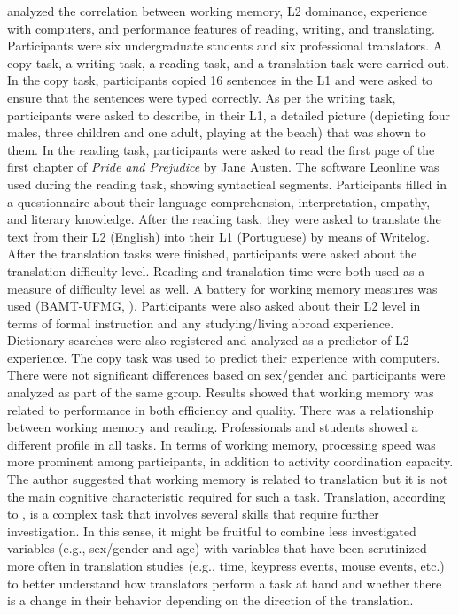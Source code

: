 \documentclass[output=paper]{langscibook}
\begin{document}
\citet{rothe2002caracteristicas} analyzed the correlation between working memory, L2 dominance, experience with computers, and performance features of reading, writing, and translating. Participants were six undergraduate students and six professional translators. A copy task, a writing task, a reading task, and a translation task were carried out. In the copy task, participants copied 16 sentences in the L1 and were asked to ensure that the sentences were typed correctly. As per the writing task, participants were asked to describe, in their L1, a detailed picture (depicting four males, three children and one adult, playing at the beach) that was shown to them. In the reading task, participants were asked to read the first page of the first chapter of \textit{Pride and Prejudice} by Jane Austen. The software Leonline was used during the reading task, showing syntactical segments. Participants filled in a questionnaire about their language comprehension, interpretation, empathy, and literary knowledge. After the reading task, they were asked to translate the text from their L2 (English) into their L1 (Portuguese) by means of Writelog. After the translation tasks were finished, participants were asked about the translation difficulty level. Reading and translation time were both used as a measure of difficulty level as well. A battery for working memory measures was used (BAMT-UFMG, \citealt{wood2001validaccao}). Participants were also asked about their L2 level in terms of formal instruction and any studying/living abroad experience. Dictionary searches were also registered and analyzed as a predictor of L2 experience. The copy task was used to predict their experience with computers. There were not significant differences based on sex/gender and participants were analyzed as part of the same group. Results showed that working memory was related to performance in both efficiency and quality. There was a relationship between working memory and reading. Professionals and students showed a different profile in all tasks. In terms of working memory, processing speed was more prominent among participants, in addition to activity coordination capacity. The author suggested that working memory is related to translation but it is not the main cognitive characteristic required for such a task. Translation, according to \citet{rothe2002caracteristicas}, is a complex task that involves several skills that require further investigation. In this sense, it might be fruitful to combine less investigated variables (e.g., sex/gender and age) with variables that have been scrutinized more often in translation studies (e.g., time, keypress events, mouse events, etc.) to better understand how translators perform a task at hand and whether there is a change in their behavior depending on the direction of the translation. 
\end{document}
